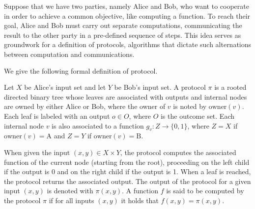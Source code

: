 Suppose that we have two parties, namely Alice and Bob, who want to cooperate in order to achieve a common objective, like computing a function. To reach their goal, Alice and Bob must carry out separate computations, communicating the result to the other party in a pre-defined sequence of steps. This idea serves as groundwork for a definition of protocols, algorithms that dictate such alternations between computation and communications. 

We give the following formal definition of protocol. \cite{comm_compl_appl}

\begin{definition}
 Let $X$ be Alice's input set and let $Y$ be Bob's input set. A protocol $\pi$ is a rooted directed binary tree whose leaves are associated with outputs and internal nodes are owned by either Alice or Bob, where the owner of $v$ is noted by $\mathrm{owner}(v)$. Each leaf is labeled with an output $o \in O$, where $O$ is the outcome set. Each internal node $v$ is also associated to a function $g_v : Z \to \{0,1\}$, where $Z = X$ if $\mathrm{owner}(v) = \mathrm{A}$ and $Z = Y$ if $\mathrm{owner}(v) = \mathrm{B}$.
\end{definition}

When given the input $(x,y) \in X \times Y$, the protocol computes the associated function of the current node (starting from the root), proceeding on the left child if the output is 0 and on the right child if the output is 1. When a leaf is reached, the protocol returns the associated output. The output of the protocol for a given input $(x,y)$ is denoted with $\pi(x,y)$. A function $f$ is said to be computed by the protocol $\pi$ if for all inputs $(x,y)$ it holds that $f(x,y) = \pi(x,y)$.

\newpage


